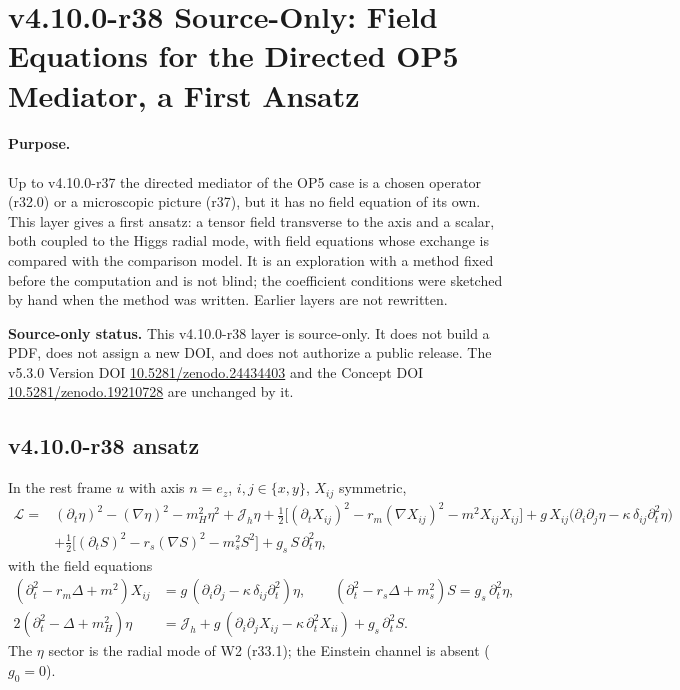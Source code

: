 \clearpage
\section*{v4.10.0-r38 Source-Only: Field Equations for the Directed OP5 Mediator, a First Ansatz}
\label{sec:v4100-r38-mediator-field-equation}

\paragraph{Purpose.}
Up to v4.10.0-r37 the directed mediator of the OP5 case is a chosen operator (r32.0) or a microscopic picture (r37), but it has no field
equation of its own.  This layer gives a first ansatz: a tensor field transverse to the axis and a scalar, both coupled to the Higgs radial
mode, with field equations whose exchange is compared with the comparison model.  It is an exploration with a method fixed before the
computation and is not blind; the coefficient conditions were sketched by hand when the method was written.  Earlier layers are not rewritten.

\noindent\textbf{Source-only status.}
This v4.10.0-r38 layer is source-only.  It does not build a PDF, does not assign a new DOI,
and does not authorize a public release.  The v5.3.0 Version DOI
\href{https://doi.org/10.5281/zenodo.24434403}{10.5281/zenodo.24434403} and the Concept DOI
\href{https://doi.org/10.5281/zenodo.19210728}{10.5281/zenodo.19210728} are unchanged by it.

\subsection*{v4.10.0-r38 ansatz}
\label{subsec:v4100-r38-ansatz}

In the rest frame \(u\) with axis \(n=e_z\), \(i,j\in\{x,y\}\), \(X_{ij}\) symmetric,
\[
\begin{aligned}
\mathcal L={}&(\partial_t\eta)^2-(\nabla\eta)^2-m_H^2\eta^2+\mathcal J_h\eta
+\tfrac12\bigl[(\partial_tX_{ij})^2-r_m(\nabla X_{ij})^2-m^2X_{ij}X_{ij}\bigr]
+g\,X_{ij}\bigl(\partial_i\partial_j\eta-\kappa\,\delta_{ij}\partial_t^2\eta\bigr)\\
&+\tfrac12\bigl[(\partial_tS)^2-r_s(\nabla S)^2-m_s^2S^2\bigr]+g_s\,S\,\partial_t^2\eta ,
\end{aligned}
\]
with the field equations
\[
\begin{aligned}
(\partial_t^2-r_m\Delta+m^2)X_{ij}&=g\,(\partial_i\partial_j-\kappa\,\delta_{ij}\partial_t^2)\eta,\qquad
(\partial_t^2-r_s\Delta+m_s^2)S=g_s\,\partial_t^2\eta,\\
2(\partial_t^2-\Delta+m_H^2)\eta&=\mathcal J_h+g\,(\partial_i\partial_jX_{ij}-\kappa\,\partial_t^2X_{ii})+g_s\,\partial_t^2S .
\end{aligned}
\]
The \(\eta\) sector is the radial mode of W2 (r33.1); the Einstein channel is absent (\(g_0=0\)).

